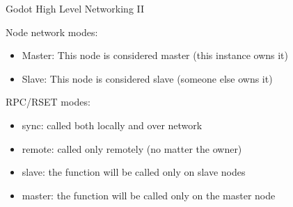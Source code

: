 \begin{frame}{Godot High Level Networking II}

Node network modes:

\begin{itemize}
    \item Master: This node is considered master (this instance owns it)
    \item Slave: This node is considered slave (someone else owns it)
\end{itemize}

RPC/RSET modes:

\begin{itemize}
    \item sync: called both locally and over network
    \item remote: called only remotely (no matter the owner)
    \item slave: the function will be called only on slave nodes
    \item master: the function will be called only on the master node
\end{itemize}

\end{frame}